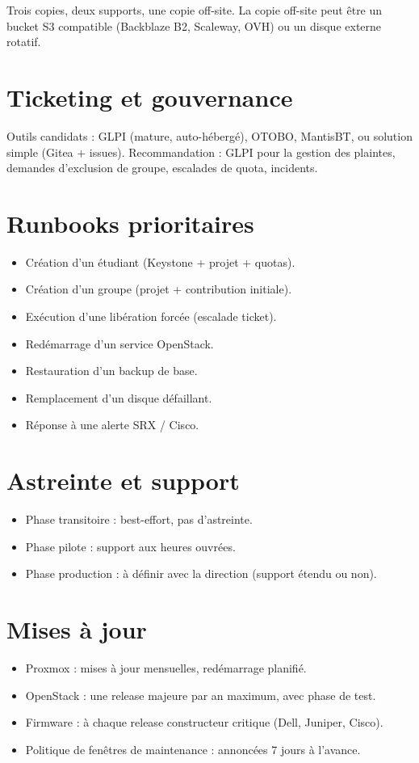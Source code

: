 \begin{okbox}[Règle 3-2-1]
Trois copies, deux supports, une copie off-site. La copie off-site peut être un bucket S3 compatible (Backblaze B2, Scaleway, OVH) ou un disque externe rotatif.
\end{okbox}

\section{Ticketing et gouvernance}
\begin{todobox}[À trancher]
Outils candidats : GLPI (mature, auto-hébergé), OTOBO, MantisBT, ou solution simple (Gitea + issues). Recommandation : GLPI pour la gestion des plaintes, demandes d'exclusion de groupe, escalades de quota, incidents.
\end{todobox}

\section{Runbooks prioritaires}
\begin{itemize}
  \item Création d'un étudiant (Keystone + projet + quotas).
  \item Création d'un groupe (projet + contribution initiale).
  \item Exécution d'une libération forcée (escalade ticket).
  \item Redémarrage d'un service OpenStack.
  \item Restauration d'un backup de base.
  \item Remplacement d'un disque défaillant.
  \item Réponse à une alerte SRX / Cisco.
\end{itemize}

\section{Astreinte et support}
\begin{itemize}
  \item Phase transitoire : best-effort, pas d'astreinte.
  \item Phase pilote : support aux heures ouvrées.
  \item Phase production : à définir avec la direction (support étendu ou non).
\end{itemize}

\section{Mises à jour}
\begin{itemize}
  \item Proxmox : mises à jour mensuelles, redémarrage planifié.
  \item OpenStack : une release majeure par an maximum, avec phase de test.
  \item Firmware : à chaque release constructeur critique (Dell, Juniper, Cisco).
  \item Politique de fenêtres de maintenance : annoncées 7 jours à l'avance.
\end{itemize}